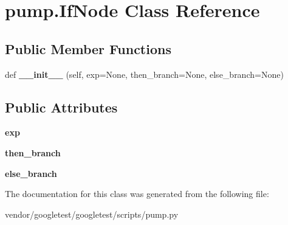 \hypertarget{classpump_1_1IfNode}{}\section{pump.\+If\+Node Class Reference}
\label{classpump_1_1IfNode}
\subsection*{Public Member Functions}
\begin{DoxyCompactItemize}
\item 
def {\bfseries \+\_\+\+\_\+init\+\_\+\+\_\+} (self, exp=None, then\+\_\+branch=None, else\+\_\+branch=None)\hypertarget{classpump_1_1IfNode_ab8bff21c18d60b461f7b6fa9dfa59f7c}{}\label{classpump_1_1IfNode_ab8bff21c18d60b461f7b6fa9dfa59f7c}

\end{DoxyCompactItemize}
\subsection*{Public Attributes}
\begin{DoxyCompactItemize}
\item 
{\bfseries exp}\hypertarget{classpump_1_1IfNode_a92042e4262196ffd7366350539f512d8}{}\label{classpump_1_1IfNode_a92042e4262196ffd7366350539f512d8}

\item 
{\bfseries then\+\_\+branch}\hypertarget{classpump_1_1IfNode_aa9e2e488564629f8dc0d64d165a19ffa}{}\label{classpump_1_1IfNode_aa9e2e488564629f8dc0d64d165a19ffa}

\item 
{\bfseries else\+\_\+branch}\hypertarget{classpump_1_1IfNode_a12e422b16ed4291f15cd95cd6e7f81eb}{}\label{classpump_1_1IfNode_a12e422b16ed4291f15cd95cd6e7f81eb}

\end{DoxyCompactItemize}


The documentation for this class was generated from the following file\+:\begin{DoxyCompactItemize}
\item 
vendor/googletest/googletest/scripts/pump.\+py\end{DoxyCompactItemize}
